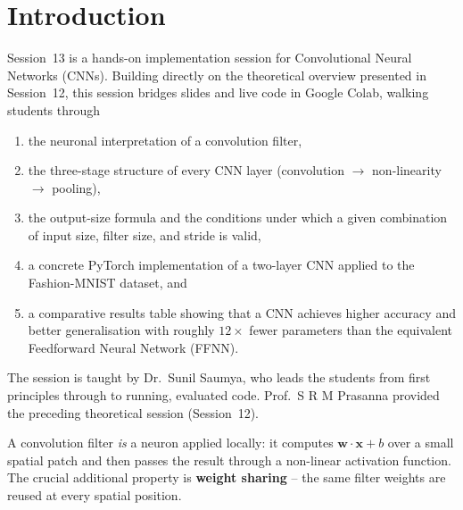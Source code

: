 \documentclass[12pt,a4paper]{article}
\begin{document}

\newpage

\section{Introduction}
\label{sec:introduction}

Session~13 is a hands-on implementation session for Convolutional Neural
Networks (CNNs).  Building directly on the theoretical overview presented in
Session~12, this session bridges slides and live code in Google Colab,
walking students through

\begin{enumerate}[label=\arabic*.]
  \item the neuronal interpretation of a convolution filter,
  \item the three-stage structure of every CNN layer
        (convolution $\to$ non-linearity $\to$ pooling),
  \item the output-size formula and the conditions under which a given
        combination of input size, filter size, and stride is valid,
  \item a concrete PyTorch implementation of a two-layer CNN applied to the
        Fashion-MNIST dataset, and
  \item a comparative results table showing that a CNN achieves higher
        accuracy and better generalisation with roughly $12\times$ fewer
        parameters than the equivalent Feedforward Neural Network (FFNN).
\end{enumerate}

The session is taught by Dr.\ Sunil Saumya, who leads the students from first
principles through to running, evaluated code.  Prof.\ S R M Prasanna
provided the preceding theoretical session (Session~12).

\begin{keyinsight}
A convolution filter \emph{is} a neuron applied locally: it computes
$\mathbf{w}\cdot\mathbf{x}+b$ over a small spatial patch and then passes the
result through a non-linear activation function.  The crucial additional
property is \textbf{weight sharing} -- the same filter weights are reused at
every spatial position.
\end{keyinsight}
\end{document}

